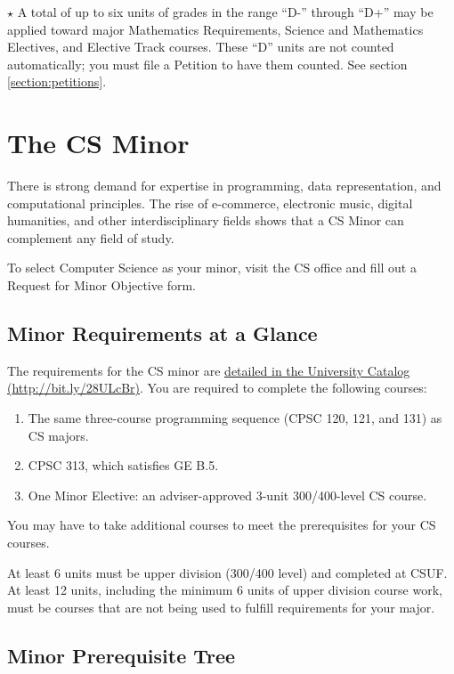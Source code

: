 \documentclass{book}
\newcommand{\CampusName}{CSUF}
\begin{document}
$\star$ A total of up to six units of grades in the range ``D-'' through ``D+'' may be applied toward major Mathematics Requirements, Science and Mathematics Electives, and Elective Track courses. These ``D'' units are not counted automatically; you must file a Petition to have them counted. See section \ref{section:petitions}.

\chapter{The CS Minor}

There is strong demand for expertise in programming, data representation, and computational principles. The rise of e-commerce, electronic music, digital humanities, and other interdisciplinary fields shows that a CS Minor can complement any field of study.

To select Computer Science as your minor, visit the CS office and fill out a Request for Minor Objective form.

\section{Minor Requirements at a Glance}
The requirements for the CS minor are \href{http://catalog.fullerton.edu/preview_program.php?catoid=2&poid=538&returnto=137}{detailed in the University Catalog (\url{http://bit.ly/28ULcBr})}. You are required to complete the following courses:
\begin{enumerate}
  \item The same three-course programming sequence (CPSC 120, 121, and 131) as CS majors.
  \item CPSC 313, which satisfies GE B.5.
  \item One Minor Elective: an adviser-approved 3-unit 300/400-level CS course.
\end{enumerate}

You may have to take additional courses to meet the prerequisites for your CS courses.

At least 6 units must be upper division (300/400 level) and completed at \CampusName. At least 12 units, including the minimum 6 units of upper division course work, must be courses that are not being used to fulfill requirements for your major.

\section{Minor Prerequisite Tree}
\end{document}
